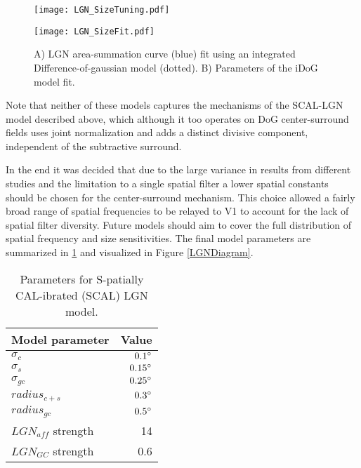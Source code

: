 \begin{figure}
	\centering
        \texttt{[image: LGN\_SizeTuning.pdf]}
	\caption{}
	\label{LGNSizeTuning}
\end{figure}

\begin{figure}
	\centering
        \texttt{[image: LGN\_SizeFit.pdf]}
	\caption{A) LGN area-summation curve (blue) fit using an
          integrated Difference-of-gaussian model (dotted). B)
          Parameters of the iDoG model fit.}
	\label{LGNSizeFit}
\end{figure}

Note that neither of these models captures the mechanisms of the
SCAL-LGN model described above, which although it too operates on DoG
center-surround fields uses joint normalization and adds a distinct
divisive component, independent of the subtractive surround.

In the end it was decided that due to the large variance in results
from different studies and the limitation to a single spatial filter a
lower spatial constants should be chosen for the center-surround
mechanism. This choice allowed a fairly broad range of spatial
frequencies to be relayed to V1 to account for the lack of spatial
filter diversity. Future models should aim to cover the full
distribution of spatial frequency and size sensitivities. The final
model parameters are summarized in \ref{LGNTuning} and visualized in
Figure \ref{LGNDiagram}.
 
\begin{table}
  \centering
  \begin{adjustbox}{width=0.3\textwidth}
  \begin{tabular}{l | r}
    Model parameter   & Value \\
    \hline
    $\sigma_c$          & $0.1 \degree$  \\
    $\sigma_s$          & $0.15 \degree$ \\
    $\sigma_{gc}$        & $0.25 \degree$  \\
    $radius_{c+s}$       & $0.3 \degree$  \\
    $radius_{gc}$        & $0.5 \degree$  \\
    \hline
    $LGN_{aff}$ strength & 14 \\
    $LGN_{GC}$ strength  & 0.6 \\
  \end{tabular}
  \end{adjustbox}
  \caption{Parameters for S-patially CAL-ibrated (SCAL) LGN model.}
  \label{LGNTuning}
\end{table}

